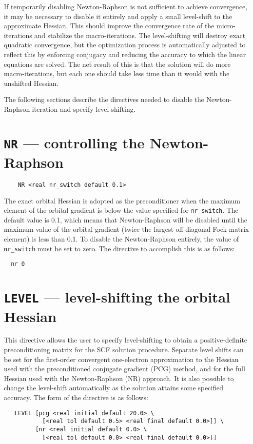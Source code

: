 If temporarily disabling Newton-Raphson is not sufficient to achieve
convergence, it may be necessary to disable it entirely and apply a
small level-shift to the approximate Hessian.  This should improve the
convergence rate of the micro-iterations and stabilize the
macro-iterations.  The level-shifting will destroy exact quadratic
convergence, but the optimization process is automatically adjusted to
reflect this by enforcing conjugacy and reducing the accuracy to which
the linear equations are solved.  The net result of this is that the
solution will do more macro-iterations, but each one should take less
time than it would with the unshifted Hessian.

The following sections describe the directives needed to disable the
Newton-Raphson iteration and specify level-shifting.

\section{{\tt NR} --- controlling the Newton-Raphson}
\label{sec:nrswitch}

\begin{verbatim}
    NR <real nr_switch default 0.1>
\end{verbatim}

The exact orbital Hessian is adopted as the preconditioner when the
maximum element of the orbital gradient is below the value specified
for \verb+nr_switch+.  The default value is 0.1, which means that
Newton-Raphson will be disabled until the maximum value of the orbital
gradient (twice the largest off-diagonal Fock matrix element) is less
than 0.1.   To disable the Newton-Raphson entirely, the
value of \verb+nr_switch+ must be set to zero.  The directive to accomplish
this is as follows:
\begin{verbatim}
  nr 0
\end{verbatim}

\section{{\tt LEVEL} --- level-shifting the orbital Hessian}
\label{sec:level}

This directive allows the user to specify level-shifting to obtain a
positive-definite preconditioning matrix for the SCF solution
procedure.  Separate level shifts can be set for the first-order
convergent one-electron approximation to the Hessian used with the
preconditioned conjugate gradient (PCG) method, and for the full
Hessian used with the Newton-Raphson (NR) approach.  It is also
possible to change the level-shift automatically as the solution
attains some specified accuracy.  The form of the directive is as
follows:
\begin{verbatim}
   LEVEL [pcg <real initial default 20.0> \
           [<real tol default 0.5> <real final default 0.0>]] \
         [nr <real initial default 0.0> \
           [<real tol default 0.0> <real final default 0.0>]]
\end{verbatim}

